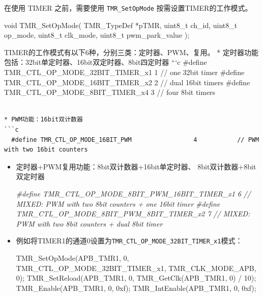 \documentclass[
  12pt,
]{book}
\newenvironment{Shaded}{\begin{snugshade}}{\end{snugshade}}
\newcommand{\BaseNTok}[1]{\textcolor[rgb]{0.00,0.00,0.81}{#1}}
\newcommand{\CommentTok}[1]{\textcolor[rgb]{0.56,0.35,0.01}{\textit{#1}}}
\newcommand{\DataTypeTok}[1]{\textcolor[rgb]{0.13,0.29,0.53}{#1}}
\newcommand{\DecValTok}[1]{\textcolor[rgb]{0.00,0.00,0.81}{#1}}
\newcommand{\NormalTok}[1]{#1}
\newcommand{\PreprocessorTok}[1]{\textcolor[rgb]{0.56,0.35,0.01}{\textit{#1}}}
\begin{document}
在使用 TIMER 之前，需要使用 \texttt{TMR\_SetOpMode} 按需设置TIMER的工作模式。

\begin{Shaded}
\begin{Highlighting}[]
\DataTypeTok{void}\NormalTok{ TMR_SetOpMode(}
\NormalTok{  TMR_TypeDef *pTMR, }
  \DataTypeTok{uint8_t}\NormalTok{ ch_id, }
  \DataTypeTok{uint8_t}\NormalTok{ op_mode, }
  \DataTypeTok{uint8_t}\NormalTok{ clk_mode, }
  \DataTypeTok{uint8_t}\NormalTok{ pwm_park_value}
\NormalTok{  );}
\end{Highlighting}
\end{Shaded}

TIMER的工作模式有以下6种，分别三类：定时器、PWM、复用。
* 定时器功能包括：32bit单定时器、16bit双定时器、8bit四定时器
```c
\#define TMR\_CTL\_OP\_MODE\_32BIT\_TIMER\_x1 1 // one 32bit timer
\#define TMR\_CTL\_OP\_MODE\_16BIT\_TIMER\_x2 2 // dual 16bit timers
\#define TMR\_CTL\_OP\_MODE\_8BIT\_TIMER\_x4 3 // four 8bit timers

\begin{verbatim}

* PWM功能：16bit双计数器
```c
  #define TMR_CTL_OP_MODE_16BIT_PWM                 4           // PWM with two 16bit counters
\end{verbatim}

\begin{itemize}
\item
  定时器+PWM复用功能：8bit双计数器+16bit单定时器、 8bit双计数器+8bit双定时器

\begin{Shaded}
\begin{Highlighting}[]
  \PreprocessorTok{#define TMR_CTL_OP_MODE_8BIT_PWM_16BIT_TIMER_x1   6           }\CommentTok{// MIXED: PWM with two 8bit counters + one 16bit timer}
  \PreprocessorTok{#define TMR_CTL_OP_MODE_8BIT_PWM_8BIT_TIMER_x2    7           }\CommentTok{// MIXED: PWM with two 8bit counters + dual 8bit timer}
\end{Highlighting}
\end{Shaded}
\item
  例如将TIMER1的通道0设置为\texttt{TMR\_CTL\_OP\_MODE\_32BIT\_TIMER\_x1}模式：

\begin{Shaded}
\begin{Highlighting}[]
\NormalTok{  TMR_SetOpMode(APB_TMR1, }\DecValTok{0}\NormalTok{, TMR_CTL_OP_MODE_32BIT_TIMER_x1, TMR_CLK_MODE_APB, }\DecValTok{0}\NormalTok{);}
\NormalTok{  TMR_SetReload(APB_TMR1, }\DecValTok{0}\NormalTok{, TMR_GetClk(APB_TMR1, }\DecValTok{0}\NormalTok{) / }\DecValTok{10}\NormalTok{);}
\NormalTok{  TMR_Enable(APB_TMR1, }\DecValTok{0}\NormalTok{, }\BaseNTok{0xf}\NormalTok{);}
\NormalTok{  TMR_IntEnable(APB_TMR1, }\DecValTok{0}\NormalTok{, }\BaseNTok{0xf}\NormalTok{);}
\end{Highlighting}
\end{Shaded}
\end{itemize}
\end{document}
